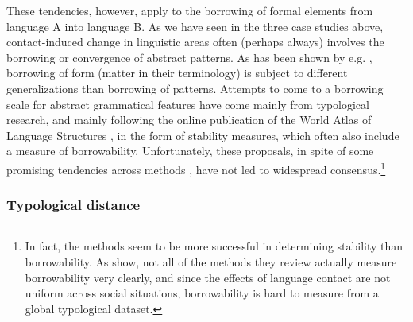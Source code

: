 \documentclass[output=paper,
modfonts
]{langscibook}
\begin{document}
These tendencies, however, apply to the borrowing of formal elements from language A into language B. As we have seen in the three case studies above, contact-induced change in linguistic areas often (perhaps always) involves the borrowing or convergence of abstract patterns. As has been shown by e.g. \textcite{matras&sakel2007}, borrowing of form (matter in their terminology) is subject to different generalizations than borrowing of patterns. Attempts to come to a borrowing scale for abstract grammatical features have come mainly from typological research, and mainly following the online publication of the World Atlas of Language Structures \parencite{wals}, in the form of stability measures, which often also include a measure of borrowability. Unfortunately, these proposals, in spite of some promising tendencies across methods \parencite{deduietal2013some}, have not led to widespread consensus.\footnote{In fact, the methods seem to be more successful in determining stability than borrowability. As \textcite[18]{deduietal2013some} show, not all of the methods they review actually measure borrowability very clearly, and since the effects of language contact are not uniform across social situations, borrowability is hard to measure from a global typological dataset.}\\

\subsubsection{Typological distance}
\end{document}

